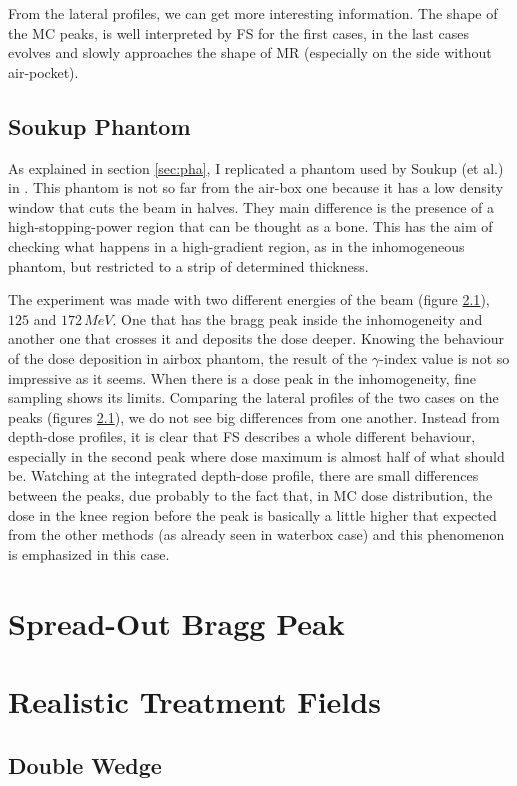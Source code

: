 \documentclass[12pt, a4paper, twoside]{book}
\begin{document}
From the lateral profiles, we can get more interesting information. The shape of the MC peaks, is well interpreted by FS for the first cases, in the last cases evolves and slowly approaches the shape of MR (especially on the side without air-pocket).

\subsection{Soukup Phantom}
As explained in section \ref{sec:pha}, I replicated a phantom used by Soukup (et al.) in \cite{souk:pba}. 
This phantom is not so far from the air-box one because it has a low density window that cuts the beam in halves. They main difference is the presence of a high-stopping-power region that can be thought as a bone. This has the aim of checking what happens in a high-gradient region, as in the inhomogeneous phantom, but restricted to a strip of determined thickness.

The experiment was made with two different energies of the beam (figure \ref{}), $125$ and $172\,MeV$. One that has the bragg peak inside the inhomogeneity and another one that crosses it and deposits the dose deeper.
Knowing the behaviour of the dose deposition in airbox phantom, the result of the $\gamma$-index value is not so impressive as it seems. When there is a dose peak in the inhomogeneity, fine sampling shows its limits.
Comparing the lateral profiles of the two cases on the peaks (figures \ref{}), we do not see big differences from one another. Instead from depth-dose profiles, it is clear that FS describes a whole different behaviour, especially in the second peak where dose maximum is almost half of what should be. Watching at the integrated depth-dose profile, there are small differences between the peaks, due probably to the fact that, in MC dose distribution, the dose in the knee region before the peak is basically a little higher that expected from the other methods (as already seen in waterbox case) and this phenomenon is emphasized in this case.


\newpage

\section{Spread-Out Bragg Peak}

\section{Realistic Treatment Fields}
\subsection{Double Wedge}
\end{document}
